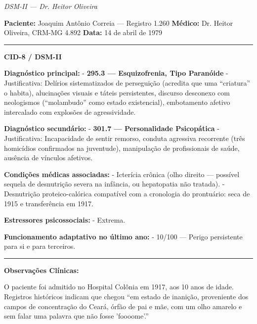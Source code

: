 
\noindent \textit{DSM-II --- Dr. Heitor Oliveira}

\noindent \textbf{Paciente:} Joaquim Antônio Correia --- Registro 1.260
\textbf{Médico:} Dr. Heitor Oliveira, CRM-MG 4.892
\textbf{Data:} 14 de abril de 1979

\vspace{0.5em}\noindent\rule{\textwidth}{0.5pt}\vspace{0.5em}

\noindent \textbf{CID-8 / DSM-II}

\noindent \textbf{Diagnóstico principal:}
- \textbf{295.3 --- Esquizofrenia, Tipo Paranóide}
  - Justificativa: Delírios sistematizados de perseguição (acredita que uma \textquotedblleft{}criatura\textquotedblright{} o habita), alucinações visuais e táteis persistentes, discurso desconexo com neologismos (\textquotedblleft{}molambudo\textquotedblright{} como estado existencial), embotamento afetivo intercalado com explosões de agressividade.

\noindent \textbf{Diagnóstico secundário:}
- \textbf{301.7 --- Personalidade Psicopática}
  - Justificativa: Incapacidade de sentir remorso, conduta agressiva recorrente (três homicídios confirmados na juventude), manipulação de profissionais de saúde, ausência de vínculos afetivos.

\noindent \textbf{Condições médicas associadas:}
- Icterícia crônica (olho direito --- possível sequela de desnutrição severa na infância, ou hepatopatia não tratada).
- Desnutrição proteico-calórica compatível com a cronologia do prontuário: seca de 1915 e transferência em 1917.

\noindent \textbf{Estressores psicossociais:}
- Extrema.

\noindent \textbf{Funcionamento adaptativo no último ano:}
- 10/100 --- Perigo persistente para si e para terceiros.

\vspace{0.5em}\noindent\rule{\textwidth}{0.5pt}\vspace{0.5em}

\noindent \textbf{Observações Clínicas:}

\noindent O paciente foi admitido no Hospital Colônia em 1917, aos 10 anos de idade. Registros históricos indicam que chegou \textquotedblleft{}em estado de inanição, proveniente dos campos de concentração do Ceará, órfão de pai e mãe, com um olho amarelo e sem falar uma palavra que não fosse 'foooome'.\textquotedblright{}

